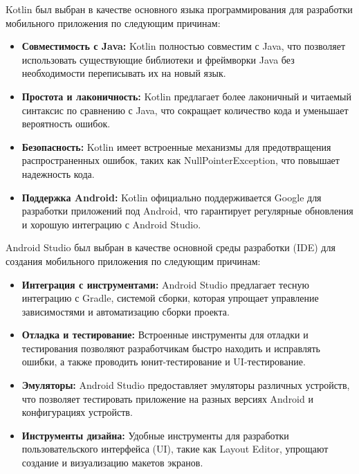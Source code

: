 
Kotlin был выбран в качестве основного языка программирования
для разработки мобильного приложения по следующим причинам:

\begin{itemize}
    \item \textbf{Совместимость с Java:} Kotlin полностью совместим с Java,
		что позволяет использовать существующие библиотеки
		и фреймворки Java без необходимости переписывать их на новый язык.
    \item \textbf{Простота и лаконичность:} Kotlin предлагает более лаконичный
		и читаемый синтаксис по сравнению с Java,
		что сокращает количество кода и уменьшает вероятность ошибок.
    \item \textbf{Безопасность:} Kotlin имеет встроенные механизмы
		для предотвращения распространенных ошибок,
		таких как NullPointerException, что повышает надежность кода.
    \item \textbf{Поддержка Android:} Kotlin официально поддерживается Google
		для разработки приложений под Android,
		что гарантирует регулярные обновления
		и хорошую интеграцию с Android Studio.
\end{itemize}


Android Studio был выбран в качестве основной среды разработки (IDE)
для создания мобильного приложения по следующим причинам:

\begin{itemize}
    \item \textbf{Интеграция с инструментами:} Android Studio предлагает
		тесную интеграцию с Gradle, системой сборки,
		которая упрощает управление зависимостями
		и автоматизацию сборки проекта.
    \item \textbf{Отладка и тестирование:} Встроенные инструменты для отладки
		и тестирования позволяют разработчикам быстро находить
		и исправлять ошибки, а также проводить юнит-тестирование
		и UI-тестирование.
    \item \textbf{Эмуляторы:} Android Studio предоставляет эмуляторы различных
		устройств, что позволяет тестировать приложение на разных версиях
		Android и конфигурациях устройств.
    \item \textbf{Инструменты дизайна:} Удобные инструменты
		для разработки пользовательского интерфейса (UI),
		такие как Layout Editor, упрощают создание
		и визуализацию макетов экранов.
\end{itemize}

